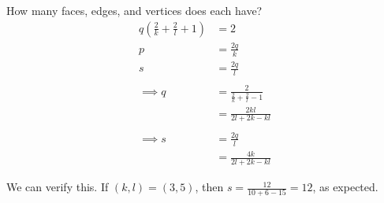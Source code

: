 \documentclass[]{article}
\theoremstyle{definition}
\begin{document}
			How many faces, edges, and vertices does each have?
			\begin{align*}
				q \left( \frac{2}{k} + \frac{2}{l} + 1 \right) &= 2 \\
				p &= \frac{2q}{k} \\
				s &= \frac{2q}{l} \\ \\
				\implies q &= \frac{2}{\frac{2}{k} + \frac{2}{l} - 1} \\
				&= \frac{2kl}{2l + 2k - kl}
				\\ \\
				\implies s &= \frac{2q}{l} \\
				&= \frac{4k}{2l + 2k - kl}
			\end{align*}

			We can verify this. If $(k, l) = (3, 5)$, then $s = \frac{12}{10 + 6 - 15} = 12$, as expected.

\end{document}
